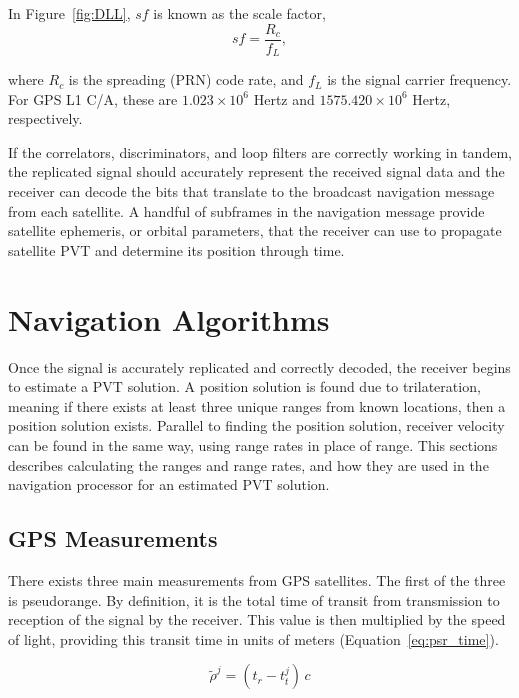 In Figure~\ref{fig:DLL}, \(sf\) is known as the scale factor,
\begin{equation}\label{eq:sf}
    sf = \frac{R_c}{f_L},
\end{equation}

where \(R_c\) is the spreading (PRN) code rate, and \(f_L\) is the signal carrier frequency. For GPS L1 C/A, these are \(1.023 \times 10^6\) Hertz and \(1575.420 \times 10^6\) Hertz, respectively.

If the correlators, discriminators, and loop filters are correctly working in tandem, the replicated signal should accurately represent the received signal data and the receiver can decode the bits that translate to the broadcast navigation message from each satellite. A handful of subframes in the navigation message provide satellite ephemeris, or orbital parameters, that the receiver can use to propagate satellite PVT and determine its position through time.

\section{Navigation Algorithms}
Once the signal is accurately replicated and correctly decoded, the receiver begins to estimate a PVT solution. A position solution is found due to trilateration, meaning if there exists at least three unique ranges from known locations, then a position solution exists. Parallel to finding the position solution, receiver velocity can be found in the same way, using range rates in place of range. This sections describes calculating the ranges and range rates, and how they are used in the navigation processor for an estimated PVT solution.

\subsection{GPS Measurements}
There exists three main measurements from GPS satellites. The first of the three is pseudorange. By definition, it is the total time of transit from transmission to reception of the signal by the receiver. This value is then multiplied by the speed of light, providing this transit time in units of meters (Equation~\ref{eq:psr_time}).

\begin{equation}\label{eq:psr_time}
    \tilde{\rho}^j = (t_r - t_t^j)\,c
\end{equation}


